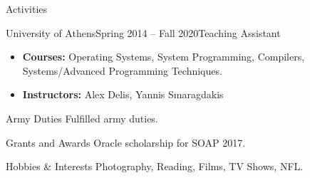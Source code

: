 \documentclass{resume}
\begin{document}
\begin{rSection}{Activities}
  \begin{rSubsection}{University of Athens}{Spring 2014 -- Fall 2020}{Teaching Assistant}{}
    \begin{itemize}[label={-}]
      \setlength\itemsep{-0.5em}
        \item {\bf Courses:}  Operating Systems, System Programming, Compilers, Systems/Advanced Programming Techniques.
        \item {\bf Instructors:} Alex Delis, Yannis Smaragdakis
      \end{itemize}
    \end{rSubsection}
\end{rSection}


\begin{rSection}{Army Duties}
Fulfilled army duties.
\end{rSection}

\begin{rSection}{Grants and Awards}
  Oracle scholarship for SOAP 2017.
\end{rSection}


\begin{rSection}{Hobbies \& Interests}
  Photography, Reading, Films, TV Shows, NFL.
\end{rSection}
\end{document}
